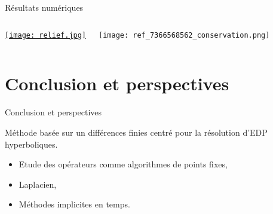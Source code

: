 \documentclass[11pt]{beamer}
\begin{document}
\begin{frame}{Résultats numériques}

\begin{columns}

\href{run:ref_7366568562.avi}{\texttt{[image: relief.jpg]}}

\texttt{[image: ref\_7366568562\_conservation.png]}

\end{columns}
\end{frame}






\section*{Conclusion et perspectives}
\begin{frame}{Conclusion et perspectives}

\begin{block}{}
Méthode basée sur un différences finies centré pour la résolution d'EDP hyperboliques.
\end{block}

\begin{block}{}
\begin{itemize}
\item Etude des opérateurs comme algorithmes de points fixes,

\item Laplacien,

\item Méthodes implicites en temps.
\end{itemize}
\end{block}


\end{frame}
\end{document}
